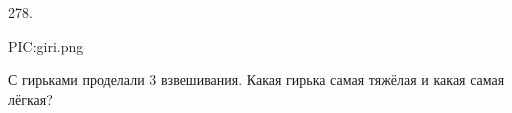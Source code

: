278. \begin{center}
{{PIC:giri.png}}
\end{center}
С гирьками проделали 3 взвешивания. Какая гирька самая тяжёлая и какая самая лёгкая?\\
